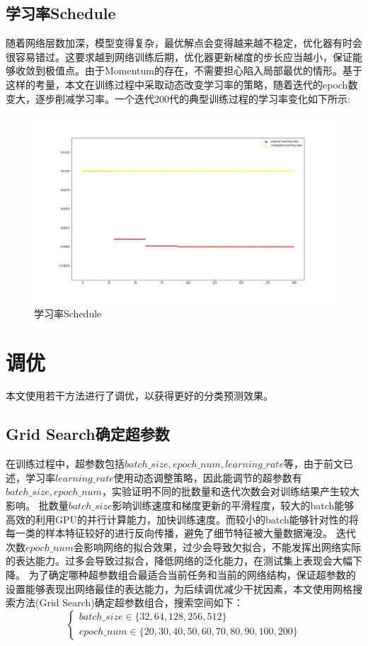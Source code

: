 \documentclass[UTF8]{ctexart}
\begin{document}
\subsection{学习率Schedule}
随着网络层数加深，模型变得复杂，最优解点会变得越来越不稳定，优化器有时会很容易错过。这要求越到网络训练后期，优化器更新梯度的步长应当越小，保证能够收敛到极值点。由于Momentum的存在，不需要担心陷入局部最优的情形。基于这样的考量，本文在训练过程中采取动态改变学习率的策略，随着迭代的epoch数变大，逐步削减学习率。一个迭代200代的典型训练过程的学习率变化如下所示:
\begin{figure}[H]
    \centering
    \includegraphics[scale=0.25]{../images/lrschedule.png}
    \caption{学习率Schedule}
\end{figure}



\section{调优}\label{chapter:3}
本文使用若干方法进行了调优，以获得更好的分类预测效果。
\subsection{Grid Search确定超参数}
在训练过程中，超参数包括$batch\_size,epoch\_num,learning\_rate$等，由于前文已述，学习率$learning\_rate$使用动态调整策略，因此能调节的超参数有$batch\_size,epoch\_num$，实验证明不同的批数量和迭代次数会对训练结果产生较大影响。
批数量$batch\_size$影响训练速度和梯度更新的平滑程度，较大的batch能够高效的利用GPU的并行计算能力，加快训练速度。而较小的batch能够针对性的将每一类的样本特征较好的进行反向传播，避免了细节特征被大量数据淹没。
迭代次数$epoch\_num$会影响网络的拟合效果，过少会导致欠拟合，不能发挥出网络实际的表达能力。过多会导致过拟合，降低网络的泛化能力，在测试集上表现会大幅下降。
为了确定哪种超参数组合最适合当前任务和当前的网络结构，保证超参数的设置能够表现出网络最佳的表达能力，为后续调优减少干扰因素，本文使用网格搜索方法(Grid Search)确定超参数组合，搜索空间如下：
\begin{equation}
    \begin{cases}
        batch\_size \in \{32,64,128,256,512\}\\
        epoch\_num \in \{20,30,40,50,60,70,80,90,100,200\}
    \end{cases}
\end{equation}
\end{document}
